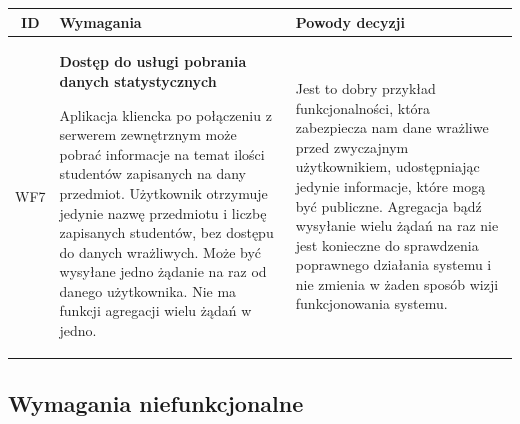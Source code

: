 \newpage
\begin{tabularx}{\textwidth}{|c|X|X|}
\hline
\textbf{ID} & \textbf{Wymagania}  & \textbf{Powody decyzji} \\
\hline

\label{z:WF7} WF7 & \textbf{Dostęp do usługi pobrania danych statystycznych} 
 
Aplikacja kliencka po połączeniu z serwerem zewnętrznym może pobrać informacje na temat ilości studentów zapisanych na dany przedmiot. Użytkownik otrzymuje jedynie nazwę przedmiotu i liczbę zapisanych studentów, bez dostępu do danych wrażliwych. Może być wysyłane jedno żądanie na raz od danego użytkownika. Nie ma funkcji agregacji wielu żądań w jedno. & 
Jest to dobry przykład funkcjonalności, która zabezpiecza nam dane wrażliwe przed zwyczajnym użytkownikiem, udostępniając jedynie informacje, które mogą być publiczne. Agregacja bądź wysyłanie wielu żądań na raz nie jest konieczne do sprawdzenia poprawnego działania systemu i nie zmienia w żaden sposób wizji funkcjonowania systemu.\\
\hline



\end{tabularx}

\subsection[Wymagania niefunkcjonalne]{Wymagania niefunkcjonalne}



